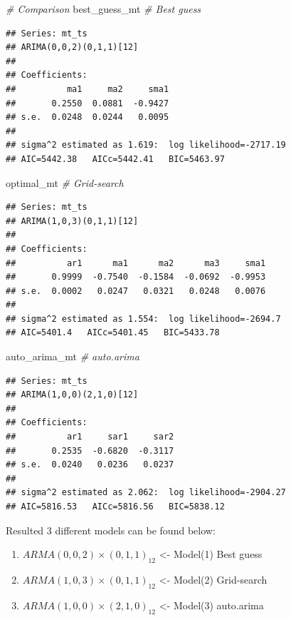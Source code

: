 \documentclass[
  11pt,
]{article}
\newenvironment{Shaded}{\begin{snugshade}}{\end{snugshade}}
\newcommand{\CommentTok}[1]{\textcolor[rgb]{0.56,0.35,0.01}{\textit{#1}}}
\newcommand{\NormalTok}[1]{#1}
\providecommand{\tightlist}{%
  \setlength{\itemsep}{0pt}\setlength{\parskip}{0pt}}
\begin{document}
\begin{Shaded}
\begin{Highlighting}[]
\CommentTok{# Comparison}
\NormalTok{best_guess_mt }\CommentTok{# Best guess}
\end{Highlighting}
\end{Shaded}

\begin{verbatim}
## Series: mt_ts 
## ARIMA(0,0,2)(0,1,1)[12] 
## 
## Coefficients:
##          ma1     ma2     sma1
##       0.2550  0.0881  -0.9427
## s.e.  0.0248  0.0244   0.0095
## 
## sigma^2 estimated as 1.619:  log likelihood=-2717.19
## AIC=5442.38   AICc=5442.41   BIC=5463.97
\end{verbatim}

\begin{Shaded}
\begin{Highlighting}[]
\NormalTok{optimal_mt }\CommentTok{# Grid-search}
\end{Highlighting}
\end{Shaded}

\begin{verbatim}
## Series: mt_ts 
## ARIMA(1,0,3)(0,1,1)[12] 
## 
## Coefficients:
##          ar1      ma1      ma2      ma3     sma1
##       0.9999  -0.7540  -0.1584  -0.0692  -0.9953
## s.e.  0.0002   0.0247   0.0321   0.0248   0.0076
## 
## sigma^2 estimated as 1.554:  log likelihood=-2694.7
## AIC=5401.4   AICc=5401.45   BIC=5433.78
\end{verbatim}

\begin{Shaded}
\begin{Highlighting}[]
\NormalTok{auto_arima_mt }\CommentTok{# auto.arima}
\end{Highlighting}
\end{Shaded}

\begin{verbatim}
## Series: mt_ts 
## ARIMA(1,0,0)(2,1,0)[12] 
## 
## Coefficients:
##          ar1     sar1     sar2
##       0.2535  -0.6820  -0.3117
## s.e.  0.0240   0.0236   0.0237
## 
## sigma^2 estimated as 2.062:  log likelihood=-2904.27
## AIC=5816.53   AICc=5816.56   BIC=5838.12
\end{verbatim}

Resulted 3 different models can be found below:

\begin{enumerate}
\def\labelenumi{\arabic{enumi}.}
\tightlist
\item
  \(ARMA(0,0,2)\times(0,1,1)_{12}\) \textless- Model(1) Best guess
\item
  \(ARMA(1,0,3)\times(0,1,1)_{12}\) \textless- Model(2) Grid-search
\item
  \(ARMA(1,0,0)\times(2,1,0)_{12}\) \textless- Model(3) auto.arima
\end{enumerate}
\end{document}
